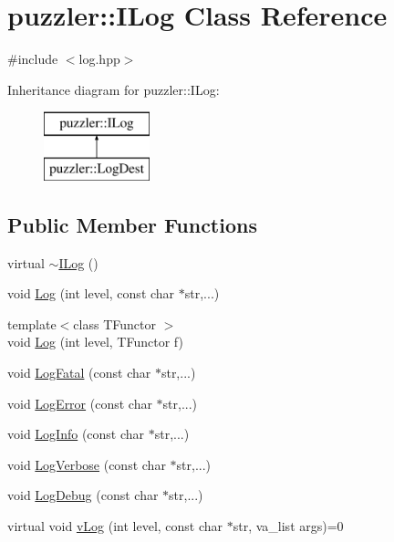 \hypertarget{a00008}{}\section{puzzler\+:\+:I\+Log Class Reference}
\label{a00008}


{\ttfamily \#include $<$log.\+hpp$>$}

Inheritance diagram for puzzler\+:\+:I\+Log\+:\begin{figure}[H]
\begin{center}
\leavevmode
\includegraphics[height=2.000000cm]{a00008}
\end{center}
\end{figure}
\subsection*{Public Member Functions}
\begin{DoxyCompactItemize}
\item 
virtual \hyperlink{a00008_a6eb498cf2e16539a9c45bc86eef22e9a}{$\sim$\+I\+Log} ()
\item 
void \hyperlink{a00008_a090b6266b033be6438e2a732f999719d}{Log} (int level, const char $\ast$str,...)
\item 
{\footnotesize template$<$class T\+Functor $>$ }\\void \hyperlink{a00008_afeb380988a6fa1d57c1eb69cc2b5301f}{Log} (int level, T\+Functor f)
\item 
void \hyperlink{a00008_a93e1f98195799e0a0bb1b72b1534f2e0}{Log\+Fatal} (const char $\ast$str,...)
\item 
void \hyperlink{a00008_a7f67c099561fcdb77ead03b82e228e0e}{Log\+Error} (const char $\ast$str,...)
\item 
void \hyperlink{a00008_a3dab7c8f26e554b6903d9cdd3cbf277e}{Log\+Info} (const char $\ast$str,...)
\item 
void \hyperlink{a00008_a89c371cdb9bc1f3e64ca1d8673f8cb7c}{Log\+Verbose} (const char $\ast$str,...)
\item 
void \hyperlink{a00008_abc9daeb0862c355133da8772f4df79d4}{Log\+Debug} (const char $\ast$str,...)
\item 
virtual void \hyperlink{a00008_a47986f80c104ed2613c372ac403c2121}{v\+Log} (int level, const char $\ast$str, va\+\_\+list args)=0
\end{DoxyCompactItemize}
